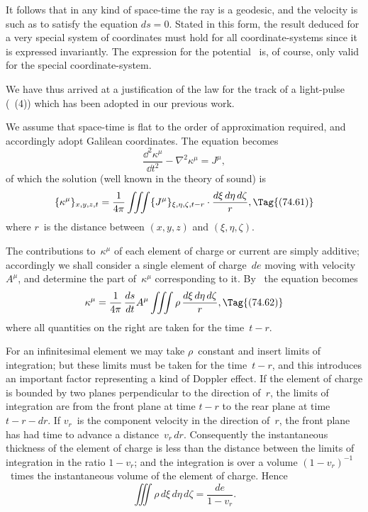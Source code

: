 \documentclass[12pt]{book}
\begin{document}
It follows that in any kind of space-time the ray is a geodesic, and the
velocity is such as to satisfy the equation $ds = 0$. Stated in this form, the
result deduced for a very special system of coordinates must hold for all
coordinate-systems since it is expressed invariantly. The expression for the
potential~ is, of course, only valid for the special coordinate-system.

We have thus arrived at a justification of the law for the track of a light-pulse
(~(4)) which has been adopted in our previous work.


We assume that space-time is flat to the order of approximation required,
and accordingly adopt Galilean coordinates. The equation becomes
\[
\frac{\dd^{2}\kappa^{\mu}}{\dd t^{2}} - \nabla^{2}\kappa^{\mu} = J^{\mu},
\]
of which the solution (well known in the theory of sound) is
\[
\{\kappa^{\mu}\}_{x,y,z,t} = \frac{1}{4\pi} \iiint \{J^{\mu}\}_{\xi,\eta,\zeta,t-r} \cdot \frac{d\xi\, d\eta\, d\zeta}{r},
\Tag{(74.61)}
\]
where $r$~is the distance between $(x, y, z)$ and $(\xi,\eta, \zeta)$.

The contributions to~$\kappa^{\mu}$ of each element of charge or current are simply
additive; accordingly we shall consider a single element of charge~$de$ moving
with velocity~$A^{\mu}$, and determine the part of~$\kappa^{\mu}$ corresponding to it. By~
the equation becomes
\[
\kappa^{\mu} = \frac{1}{4\pi}\, \frac{ds}{dt} A^{\mu} \iiint \rho\, \frac{d\xi\, d\eta\, d\zeta}{r},
\Tag{(74.62)}
\]
where all quantities on the right are taken for the time~$t - r$.

For an infinitesimal element we may take $\rho$~constant and insert limits of
integration; but these limits must be taken for the time~$t - r$, and this introduces
an important factor representing a kind of Doppler effect. If the element
of charge is bounded by two planes perpendicular to the direction of~$r$, the
limits of integration are from the front plane at time $t - r$ to the rear plane
%
at time $t - r - dr$. If $v_{r}$~is the component velocity in the direction of~$r$, the
front plane has had time to advance a distance~$v_{r}\, dr$. Consequently the
instantaneous thickness of the element of charge is less than the distance
between the limits of integration in the ratio $1 - v_{r}$; and the integration is
over a volume $(1 - v_{r})^{-1}$~times the instantaneous volume of the element of
charge. Hence
\[
\iiint \rho\, d\xi\, d\eta\, d\zeta = \frac{de}{1 - v_{r}}.
\]
\end{document}
